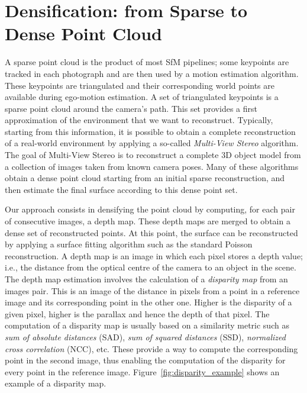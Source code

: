 \section{Densification: from Sparse to Dense Point Cloud}
\label{sec:mvs}
A sparse point cloud is the product of most SfM pipelines; some keypoints are tracked in each photograph and are then used by a motion estimation algorithm. These keypoints are triangulated and their corresponding world points are available during ego-motion estimation.
%
A set of triangulated keypoints is a sparse point cloud around the camera's path. This set provides a first approximation of the environment that we want to reconstruct.
Typically, starting from this information, it is possible to obtain a complete reconstruction of a real-world environment by applying
a so-called \emph{Multi-View Stereo} algorithm. The goal of Multi-View Stereo\cite{seitz2006comparison} is to reconstruct a complete
3D object model from a collection of images taken from known camera poses.
Many of these algorithms obtain a dense point cloud starting from an initial sparse reconstruction, and then estimate the final surface according to this dense point set.

Our approach consists in densifying the point cloud by computing, for each pair of consecutive images, 
a depth map. These depth maps are merged to obtain a dense set of reconstructed points. At this point, the 
surface can be reconstructed by applying a surface fitting algorithm such as the standard Poisson reconstruction.
A depth map is an image in which each pixel stores a depth value; i.e., the distance from the optical centre of the camera to an object in the scene.
The depth map estimation involves the calculation of a \emph{disparity map} from an images pair. 
This is an image of the distance in pixels from a point in a reference image and its corresponding
point in the other one. Higher is the disparity of a given pixel, higher is the parallax and hence the depth of that pixel. 
%
The computation of a disparity map is usually based on a similarity metric such as 
\emph{sum of absolute distances} (SAD), \emph{sum of squared distances} (SSD), 
\emph{normalized cross correlation} (NCC), etc. 
These provide a way to compute the corresponding point in the second image, thus enabling the 
computation of the disparity for every point in the reference image.
Figure~\ref{fig:disparity_example} shows an example of a disparity map.

